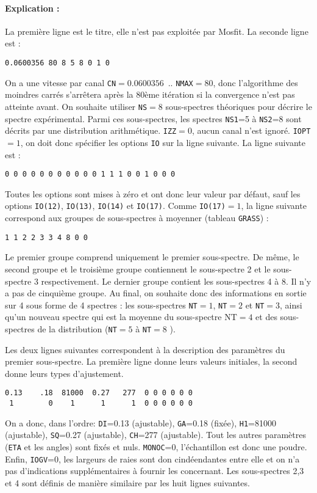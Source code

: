 \paragraph{Explication :}
La première ligne est le titre, elle n'est pas exploitée par Mosfit. 
La seconde ligne est :
\begin{lstlisting}[frame=single]
0.0600356 80 8 5 8 0 1 0
\end{lstlisting}
On a une vitesse par canal \lstinline{CN}$=0.0600356$~\milli\meter.\reciprocal\second.
\lstinline{NMAX}$=80$, donc l'algorithme des moindres carrés s'arrêtera après la 80ème itération si la convergence n'est pas atteinte avant.
On souhaite utiliser \lstinline{NS}$=8$ sous-spectres théoriques pour décrire le spectre expérimental.
Parmi ces sous-spectres, les spectres \lstinline{NS1}=5 à \lstinline{NS2}=8 sont décrits par une distribution arithmétique.
\lstinline{IZZ}$=0$, aucun canal n'est ignoré. \lstinline{IOPT}$=1$, on doit donc spécifier les options \lstinline{IO} sur la ligne suivante. La ligne suivante est :
\begin{lstlisting}[frame=single]
0 0 0 0 0 0 0 0 0 0 0 1 1 1 0 0 1 0 0 0
\end{lstlisting}
Toutes les options sont mises à zéro et ont donc leur valeur par défaut, sauf les options \lstinline{IO(12)}, \lstinline{IO(13)}, \lstinline{IO(14)} et \lstinline{IO(17)}.
Comme \lstinline{IO(17)}$=1$, la ligne suivante correspond aux groupes de sous-spectres à moyenner (tableau \lstinline{GRASS}) :
\begin{lstlisting}[frame=single]
1 1 2 2 3 3 4 8 0 0
\end{lstlisting}
Le premier groupe comprend uniquement le premier sous-spectre.
 De même, le second groupe et le troisième groupe contiennent le sous-spectre 2 et le sous-spectre 3 respectivement.
Le dernier groupe contient les sous-spectres 4 à 8. Il n'y a pas de cinquième groupe. 
Au final, on souhaite donc des informations en sortie sur 4 sous forme de 4 spectres : les sous-spectres \lstinline{NT}$=1$, \lstinline{NT}$=2$  et \lstinline{NT}$=3$,  ainsi qu'un nouveau spectre qui est la moyenne du sous-spectre $\text{NT}=4$  et des sous-spectres de la distribution (\lstinline{NT}$=5$ à \lstinline{NT}$=8$ ).

Les deux lignes suivantes correspondent à la description des paramètres du premier sous-spectre.
La première ligne donne leurs valeurs initiales, la second donne leurs types d'ajustement.
\begin{lstlisting}[frame=single]
0.13    .18  81000  0.27   277  0 0 0 0 0 0 
 1        0    1      1      1  0 0 0 0 0 0
\end{lstlisting}
On a donc, dans l'ordre: \lstinline{DI}=0.13 (ajustable),  \lstinline{GA}=0.18 (fixée), \lstinline{H1}=81000 (ajustable), \lstinline{SQ}=0.27 (ajustable), \lstinline{CH}=277 (ajustable).
 Tout les autres paramètres (\lstinline{ETA} et les angles) sont fixés et nuls.
\lstinline{MONOC}=0, l'échantillon est donc une poudre. Enfin,  \lstinline{IOGV}=0, les largeurs de raies sont don cindéendantes entre elle et on n'a pas d'indications supplémentaires à fournir les concernant.
Les sous-spectres 2,3 et 4 sont définis de manière similaire par les huit lignes suivantes.

